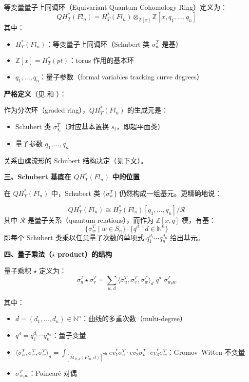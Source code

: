 等变量量子上同调环（Equivariant Quantum Cohomology Ring）定义为：
$$QH_T^*(Fl_n) = H_T^*(Fl_n) \otimes_{\mathbb{Z}[x]} \mathbb{Z}[x, q_1, \ldots, q_n]$$
其中：
\begin{itemize}
\item $H_T^*(Fl_n)$：等变量子上同调环（Schubert 类 $\sigma_w^T$ 是基）
\item $\mathbb{Z}[x] = H_T^*(pt)$：torus 作用的基本环
\item $q_1, \ldots, q_n$：量子参数（formal variables tracking curve degrees）
\end{itemize}

\textbf{严格定义}（见 \cite[Section 3]{Kim2000} 和 \cite[Section 2]{Mihalcea}）：

作为分次环（graded ring），$QH_T^*(Fl_n)$ 的生成元是：
\begin{itemize}
\item Schubert 类 $\sigma_{s_i}^T$（对应基本置换 $s_i$，即超平面类）
\item 量子参数 $q_1, \ldots, q_n$
\end{itemize}

关系由旗流形的 Schubert 结构决定（见下文）。

\textbf{三、Schubert 基底在 $QH_T^*(Fl_n)$ 中的位置}

在 $QH_T^*(Fl_n)$ 中，Schubert 类 $\{\sigma_w^T\}$ 仍然构成一组基元。更精确地说：

$$QH_T^*(Fl_n) \cong H_T^*(Fl_n)[q_1, \ldots, q_n] / \mathcal{R}$$
其中 $\mathcal{R}$ 是量子关系（quantum relations），而作为 $\mathbb{Z}[x, q]$-模，有基：
$$\{\sigma_w^T \mid w \in S_n\} \cdot \{q^d \mid d \in \mathbb{N}^n\}$$
即每个 Schubert 类乘以任意量子次数的单项式 $q_1^{d_1}\cdots q_n^{d_n}$ 给出基元。

\textbf{四、量子乘法（$\star$ product）的结构}

量子乘积 $\star$ 定义为：
$$\sigma_u^T \star \sigma_v^T = \sum_{w, d} \langle \sigma_u^T, \sigma_v^T, \sigma_w^T \rangle_d \; q^d \; \sigma_{w_0w}^T$$

其中：
\begin{itemize}
\item $d = (d_1, \ldots, d_n) \in \mathbb{N}^n$：曲线的多重次数（multi-degree）
\item $q^d = q_1^{d_1}\cdots q_n^{d_n}$：量子变量
\item $\langle \sigma_u^T, \sigma_v^T, \sigma_w^T \rangle_d = \int_{[\overline{\mathcal{M}}_{0,3}(Fl_n, d)]^{\text{vir}}} ev_1^*\sigma_u^T \cdot ev_2^*\sigma_v^T \cdot ev_3^*\sigma_w^T$：Gromov--Witten 不变量
\item $\sigma_{w_0w}^T$：Poincaré 对偶
\end{itemize}


